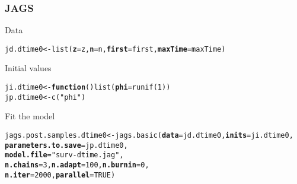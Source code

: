 \documentclass[color=usenames,dvipsnames]{beamer}\usepackage[]{graphicx}\usepackage[]{xcolor}
\makeatletter
\newcommand{\hlnum}[1]{\textcolor[rgb]{0.69,0.494,0}{#1}}%
\newcommand{\hlsng}[1]{\textcolor[rgb]{0.749,0.012,0.012}{#1}}%
\newcommand{\hldef}[1]{\textcolor[rgb]{0,0,0}{#1}}%
\newcommand{\hlkwa}[1]{\textcolor[rgb]{0,0,0}{\textbf{#1}}}%
\newcommand{\hlkwb}[1]{\textcolor[rgb]{0,0.341,0.682}{#1}}%
\newcommand{\hlkwc}[1]{\textcolor[rgb]{0,0,0}{\textbf{#1}}}%
\newcommand{\hlkwd}[1]{\textcolor[rgb]{0.004,0.004,0.506}{#1}}%
\newenvironment{kframe}{%
 \def\at@end@of@kframe{}%
 \ifinner\ifhmode%
  \def\at@end@of@kframe{\end{minipage}}%
  \begin{minipage}{\columnwidth}%
 \fi\fi%
 \def\FrameCommand##1{\hskip\@totalleftmargin \hskip-\fboxsep
 \colorbox{shadecolor}{##1}\hskip-\fboxsep
     \hskip-\linewidth \hskip-\@totalleftmargin \hskip\columnwidth}%
 \MakeFramed {\advance\hsize-\width
   \@totalleftmargin\z@ \linewidth\hsize
   \@setminipage}}%
 {\par\unskip\endMakeFramed%
 \at@end@of@kframe}
\newenvironment{knitrout}{}{} %
\let\hlstd\hldef
\let\hlstr\hlsng
\makeatother
\begin{document}
\begin{frame}[fragile]
  \frametitle{JAGS}
  Data
\begin{knitrout}\scriptsize
{}\color{fgcolor}\begin{kframe}
\begin{alltt}
\hldef{jd.dtime0} \hlkwb{<-} \hlkwd{list}\hldef{(}\hlkwc{z}\hldef{=z,} \hlkwc{n}\hldef{=n,} \hlkwc{first}\hldef{=first,} \hlkwc{maxTime}\hldef{=maxTime)}
\end{alltt}
\end{kframe}
\end{knitrout}
  Initial values
  \scriptsize
\begin{knitrout}\scriptsize
{}\color{fgcolor}\begin{kframe}
\begin{alltt}
\hldef{ji.dtime0} \hlkwb{<-} \hlkwa{function}\hldef{()} \hlkwd{list}\hldef{(}\hlkwc{phi}\hldef{=}\hlkwd{runif}\hldef{(}\hlnum{1}\hldef{))}
\hldef{jp.dtime0} \hlkwb{<-} \hlkwd{c}\hldef{(}\hlsng{"phi"}\hldef{)}
\end{alltt}
\end{kframe}
\end{knitrout}
\pause
\vfill
  {\normalsize Fit the model}
\begin{knitrout}\scriptsize
{}\color{fgcolor}\begin{kframe}
\begin{alltt}
\hlstd{jags.post.samples.dtime0} \hlkwb{<-} \hlkwd{jags.basic}\hlstd{(}\hlkwc{data}\hlstd{=jd.dtime0,} \hlkwc{inits}\hlstd{=ji.dtime0,}
                                       \hlkwc{parameters.to.save}\hlstd{=jp.dtime0,}
                                       \hlkwc{model.file}\hlstd{=}\hlstr{"surv-dtime.jag"}\hlstd{,}
                                       \hlkwc{n.chains}\hlstd{=}\hlnum{3}\hlstd{,} \hlkwc{n.adapt}\hlstd{=}\hlnum{100}\hlstd{,} \hlkwc{n.burnin}\hlstd{=}\hlnum{0}\hlstd{,}
                                       \hlkwc{n.iter}\hlstd{=}\hlnum{2000}\hlstd{,} \hlkwc{parallel}\hlstd{=}\hlnum{TRUE}\hlstd{)}
\end{alltt}
\end{kframe}
\end{knitrout}
\end{frame}
\end{document}
